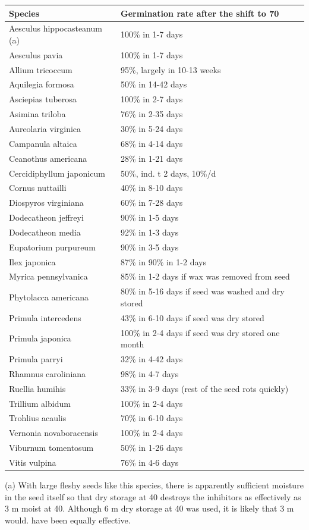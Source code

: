 \begin{table}[h!]
\begin{tabular}{|l|l|}
\hline
Species & Germination rate after the shift to 70 \\
\hline
Aesculus hippocasteanum (a) & 100\% in 1-7 days \\
Aesculus pavia & 100\% in 1-7 days \\
Allium tricoccum & 95\%, largely in 10-13 weeks \\
Aquilegia formosa & 50\% in 14-42 days \\
Asciepias tuberosa & 100\% in 2-7 days \\
Asimina triloba & 76\% in 2-35 days \\
Aureolaria virginica & 30\% in 5-24 days \\
Campanula altaica & 68\% in 4-14 days \\
Ceanothus americana & 28\% in 1-21 days \\
Cercidiphyllum japonicum & 50\%, ind. t 2 days, 10\%/d \\
Cornus nuttailli & 40\% in 8-10 days \\
Diospyros virginiana & 60\% in 7-28 days \\
Dodecatheon jeffreyi & 90\% in 1-5 days \\
Dodecatheon media & 92\% in 1-3 days \\
Eupatorium purpureum & 90\% in 3-5 days \\
Ilex japonica & 87\% in 90\% in 1-2 days \\
Myrica pennsylvanica & 85\% in 1-2 days if wax was removed from seed \\
Phytolacca americana & 80\% in 5-16 days if seed was washed and dry stored \\
Primula intercedens & 43\% in 6-10 days if seed was dry stored \\
Primula japonica & 100\% in 2-4 days if seed was dry stored one month \\
Primula parryi & 32\% in 4-42 days \\
Rhamnus caroliniana & 98\% in 4-7 days \\
Ruellia humihis & 33\% in 3-9 days (rest of the seed rots quickly) \\
Trillium albidum & 100\% in 2-4 days \\
Trohlius acaulis & 70\% in 6-10 days \\
Vernonia novaboracensis & 100\% in 2-4 days \\
Viburnum tomentosum & 50\% in 1-26 days \\
Vitis vulpina & 76\% in 4-6 days \\
\hline
\end{tabular}

\hfil

(a) With large fleshy seeds like this species, there is apparently sufficient
moisture in the seed itself so that dry storage at 40 destroys the inhibitors as effectively
as 3 m moist at 40. Although 6 m dry storage at 40 was used, it is likely that 3 m would.
have been equally effective.

\label{table:id40}
\end{table}

